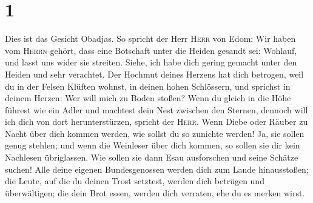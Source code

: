 \hypertarget{section}{%
\section{1}\label{section}}

 Dies ist das Gesicht Obadjas. So spricht der Herr
\textsc{Herr} von Edom: Wir haben vom \textsc{Herrn} gehört, dass eine
Botschaft unter die Heiden gesandt sei: Wohlauf, und lasst uns wider sie
streiten.  Siehe, ich habe dich gering gemacht unter den
Heiden und sehr verachtet.  Der Hochmut deines Herzens hat
dich betrogen, weil du in der Felsen Klüften wohnst, in deinen hohen
Schlössern, und sprichst in deinem Herzen: Wer will mich zu Boden
stoßen?  Wenn du gleich in die Höhe führest wie ein Adler
und machtest dein Nest zwischen den Sternen, dennoch will ich dich von
dort herunterstürzen, spricht der \textsc{Herr}.  Wenn
Diebe oder Räuber zu Nacht über dich kommen werden, wie sollst du so
zunichte werden! Ja, sie sollen genug stehlen; und wenn die Weinleser
über dich kommen, so sollen sie dir kein Nachlesen übriglassen.
 Wie sollen sie dann Esau ausforschen und seine Schätze
suchen!  Alle deine eigenen Bundesgenossen werden dich zum
Lande hinausstoßen; die Leute, auf die du deinen Trost setztest, werden
dich betrügen und überwältigen; die dein Brot essen, werden dich
verraten, ehe du es merken wirst.

